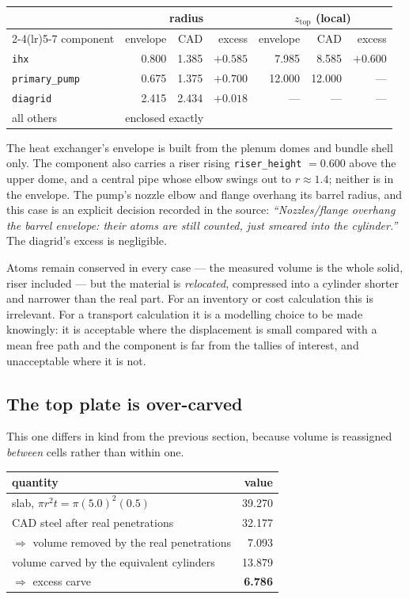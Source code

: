 \documentclass[9pt,a4paper]{extarticle}
\newcommand{\code}[1]{\texttt{\small #1}}
\begin{document}
\begin{center}
\begin{tabular}{@{}lrrrrrr@{}}
\toprule
& \multicolumn{3}{c}{radius} & \multicolumn{3}{c}{$z_{\mathrm{top}}$ (local)} \\
\cmidrule(lr){2-4}\cmidrule(lr){5-7}
component & envelope & CAD & excess & envelope & CAD & excess \\
\midrule
\code{ihx} & 0.800 & 1.385 & $+0.585$ & 7.985 & 8.585 & $+0.600$ \\
\code{primary\_pump} & 0.675 & 1.375 & $+0.700$ & 12.000 & 12.000 & --- \\
\code{diagrid} & 2.415 & 2.434 & $+0.018$ & --- & --- & --- \\
all others & \multicolumn{6}{l}{enclosed exactly} \\
\bottomrule
\end{tabular}
\end{center}

\noindent
The heat exchanger's envelope is built from the plenum domes and bundle shell
only. The component also carries a riser rising \code{riser\_height} $=0.600$
above the upper dome, and a central pipe whose elbow swings out to $r\approx1.4$;
neither is in the envelope. The pump's nozzle elbow and flange overhang its
barrel radius, and this case is an explicit decision recorded in the source:
\emph{``Nozzles/flange overhang the barrel envelope: their atoms are still
counted, just smeared into the cylinder.''} The diagrid's excess is negligible.

Atoms remain conserved in every case --- the measured volume is the whole solid,
riser included --- but the material is \emph{relocated}, compressed into a
cylinder shorter and narrower than the real part. For an inventory or cost
calculation this is irrelevant. For a transport calculation it is a modelling
choice to be made knowingly: it is acceptable where the displacement is small
compared with a mean free path and the component is far from the tallies of
interest, and unacceptable where it is not.

\subsection{The top plate is over-carved}

This one differs in kind from the previous section, because volume is
reassigned \emph{between} cells rather than within one.

\begin{center}
\begin{tabular}{@{}lr@{}}
\toprule
quantity & value \\
\midrule
slab, $\pi r^2 t = \pi (5.0)^2 (0.5)$ & 39.270 \\
CAD steel after real penetrations & 32.177 \\
$\Rightarrow$ volume removed by the real penetrations & 7.093 \\
volume carved by the equivalent cylinders & 13.879 \\
$\Rightarrow$ excess carve & \textbf{6.786} \\
\bottomrule
\end{tabular}
\end{center}
\end{document}
